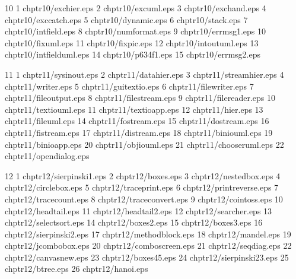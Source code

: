 10	1	chptr10/exchier.eps
	2	chptr10/excuml.eps
	3	chptr10/exchand.eps
	4	chptr10/exccatch.eps
	5	chptr10/dynamic.eps
	6	chptr10/stack.eps
	7	chptr10/intfield.eps
	8	chptr10/numformat.eps
	9	chptr10/errmsg1.eps
	10	chptr10/fixuml.eps
	11	chptr10/fixpic.eps
	12	chptr10/intoutuml.eps
	13	chptr10/intfielduml.eps
	14	chptr10/p634f1.eps
	15	chptr10/errmsg2.eps

11	1	chptr11/sysinout.eps
	2	chptr11/datahier.eps
	3	chptr11/streamhier.eps
	4	chptr11/writer.eps
	5	chptr11/guitextio.eps
	6	chptr11/filewriter.eps
	7	chptr11/fileoutput.eps
	8	chptr11/filestream.eps
	9	chptr11/filereader.eps
	10	chptr11/textiouml.eps
	11	chptr11/textioapp.eps
	12	chptr11/hier.eps
	13	chptr11/fileuml.eps
	14	chptr11/fostream.eps
	15	chptr11/dostream.eps
	16	chptr11/fistream.eps
	17	chptr11/distream.eps
	18	chptr11/biniouml.eps
	19	chptr11/binioapp.eps
	20	chptr11/objiouml.eps
	21	chptr11/chooseruml.eps
	22	chptr11/opendialog.eps

12	1	chptr12/sierpinski1.eps
 	2	chptr12/boxes.eps
	3	chptr12/nestedbox.eps
	4	chptr12/circlebox.eps
	5	chptr12/traceprint.eps
	6	chptr12/printreverse.eps
	7	chptr12/tracecount.eps
	8	chptr12/traceconvert.eps
	9	chptr12/cointoss.eps
	10	chptr12/headtail.eps
	11	chptr12/headtail2.eps
	12	chptr12/searcher.eps
	13	chptr12/selectsort.eps
	14	chptr12/boxes2.eps
	15	chptr12/boxes3.eps
	16	chptr12/sierpinski2.eps
	17	chptr12/methodblock.eps
	18	chptr12/mandel.eps
	19	chptr12/jcombobox.eps
	20	chptr12/comboscreen.eps
	21	chptr12/seqdiag.eps
	22	chptr12/canvasnew.eps
	23	chptr12/boxes45.eps
	24	chptr12/sierpinski23.eps
	25	chptr12/btree.eps
	26	chptr12/hanoi.eps

